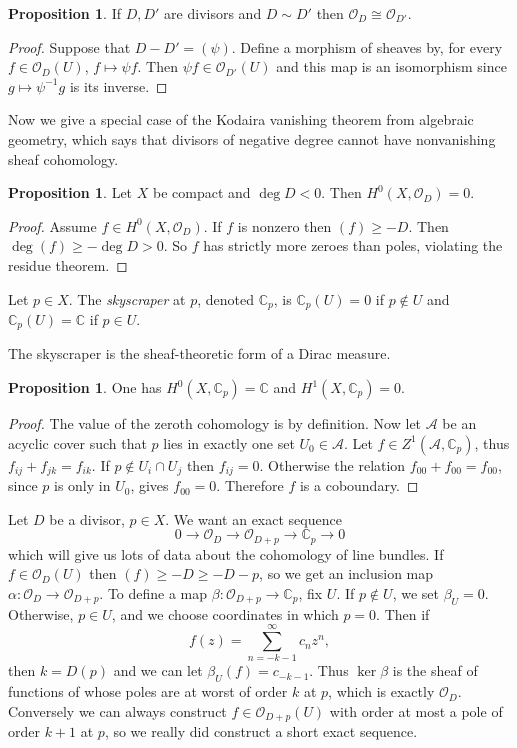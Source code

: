 \documentclass[12pt]{book}
\newcommand{\CC}{\mathbb{C}}
\newcommand{\Olo}{\mathscr O}
\newcommand{\dfn}[1]{\emph{#1}\index{#1}}
\theoremstyle{definition}
\newtheorem{proposition}[theorem]{Proposition}
\newenvironment{definition}
  {\pushQED{\qed}\renewcommand{\qedsymbol}{$\diamondsuit$}\definitionx}
  {\popQED\endexamplex}
\begin{document}
\begin{proposition}
If $D, D'$ are divisors and $D \sim D'$ then $\Olo_D \cong \Olo_{D'}$.
\end{proposition}
\begin{proof}
Suppose that $D - D' = (\psi)$.
Define a morphism of sheaves by, for every $f \in \Olo_D(U)$, $f \mapsto \psi f$.
Then $\psi f \in \Olo_{D'}(U)$ and this map is an isomorphism since $g \mapsto \psi^{-1}g$ is its inverse.
\end{proof}

Now we give a special case of the Kodaira vanishing theorem from algebraic geometry, which says that divisors of negative degree cannot have nonvanishing sheaf cohomology.

\begin{proposition}
Let $X$ be compact and $\deg D < 0$. Then $H^0(X, \Olo_D) = 0$.
\end{proposition}
\begin{proof}
Assume $f \in H^0(X, \Olo_D)$. If $f$ is nonzero then $(f) \geq -D$. Then $\deg (f) \geq -\deg D > 0$.
So $f$ has strictly more zeroes than poles, violating the residue theorem.
\end{proof}

\begin{definition}
Let $p \in X$. The \dfn{skyscraper} at $p$, denoted $\CC_p$, is $\CC_p(U) = 0$ if $p \notin U$ and $\CC_p(U) = \CC$ if $p \in U$.
\end{definition}

The skyscraper is the sheaf-theoretic form of a Dirac measure.

\begin{proposition}
One has $H^0(X, \CC_p) = \CC$ and $H^1(X, \CC_p) = 0$.
\end{proposition}
\begin{proof}
The value of the zeroth cohomology is by definition.
Now let $\mathscr A$ be an acyclic cover such that $p$ lies in exactly one set $U_0 \in \mathscr A$.
Let $f \in Z^1(\mathscr A, \CC_p)$, thus $f_{ij} + f_{jk} = f_{ik}$.
If $p \notin U_i \cap U_j$ then $f_{ij} = 0$.
Otherwise the relation $f_{00} + f_{00} = f_{00}$, since $p$ is only in $U_0$, gives $f_{00} = 0$.
Therefore $f$ is a coboundary.
\end{proof}

Let $D$ be a divisor, $p \in X$. We want an exact sequence
$$0 \to \Olo_D \to \Olo_{D + p} \to \CC_p \to 0$$
which will give us lots of data about the cohomology of line bundles.
If $f \in \Olo_D(U)$ then $(f) \geq -D \geq -D - p$, so we get an inclusion map $\alpha: \Olo_D \to \Olo_{D + p}$.
To define a map $\beta: \Olo_{D + p} \to \CC_p$, fix $U$.
If $p \notin U$, we set $\beta_U = 0$.
Otherwise, $p \in U$, and we choose coordinates in which $p = 0$. Then if
$$f(z) = \sum_{n=-k-1}^\infty c_n z^n,$$
then $k = D(p)$ and we can let $\beta_U(f) = c_{-k-1}$.
Thus $\ker \beta$ is the sheaf of functions of whose poles are at worst of order $k$ at $p$, which is exactly $\Olo_D$.
Conversely we can always construct $f \in \Olo_{D + p}(U)$ with order at most a pole of order $k + 1$ at $p$,
so we really did construct a short exact sequence.
\end{document}
